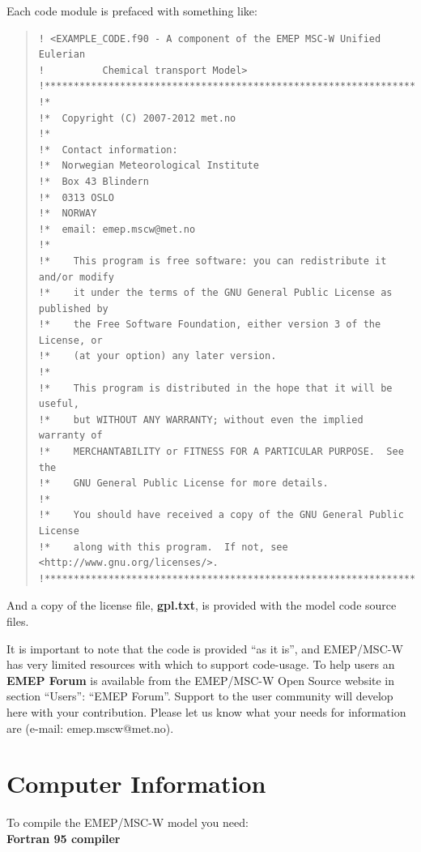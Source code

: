 Each code module is prefaced with something like:
\begin{quote}
\begin{small}
\begin{verbatim}
! <EXAMPLE_CODE.f90 - A component of the EMEP MSC-W Unified Eulerian
!          Chemical transport Model>
!*****************************************************************************!
!*
!*  Copyright (C) 2007-2012 met.no
!*
!*  Contact information:
!*  Norwegian Meteorological Institute
!*  Box 43 Blindern
!*  0313 OSLO
!*  NORWAY
!*  email: emep.mscw@met.no
!*
!*    This program is free software: you can redistribute it and/or modify
!*    it under the terms of the GNU General Public License as published by
!*    the Free Software Foundation, either version 3 of the License, or
!*    (at your option) any later version.
!*
!*    This program is distributed in the hope that it will be useful,
!*    but WITHOUT ANY WARRANTY; without even the implied warranty of
!*    MERCHANTABILITY or FITNESS FOR A PARTICULAR PURPOSE.  See the
!*    GNU General Public License for more details.
!*
!*    You should have received a copy of the GNU General Public License
!*    along with this program.  If not, see <http://www.gnu.org/licenses/>.
!*****************************************************************************!
\end{verbatim}
\end{small}
\end{quote}
And a copy of the license file, {\bf gpl.txt}, is provided with the
model code source files.

\noindent It is important to note that the code is provided ``as it is'', 
and EMEP/MSC-W has very limited resources with which to support
code-usage. To help users an {\bf EMEP Forum} is available from the
EMEP/MSC-W Open Source website in section ``Users'': ``EMEP Forum''. 
Support to the user community will develop here with your contribution. 
Please let us know what your needs for information are 
(e-mail: emep.mscw@met.no).

\newpage

\section{Computer Information}
\label{sec:compinf}

To compile the EMEP/MSC-W model you need:\\

\textbf{Fortran 95 compiler}

